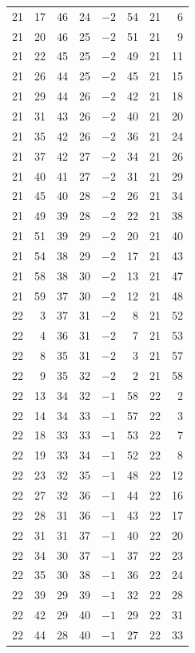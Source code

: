 \begin{center}
\begin{longtable}{rr c c rr rr}
21 & 17 & 46 & 24 & $-2$ & 54 & 21 & 6 \\
21 & 20 & 46 & 25 & $-2$ & 51 & 21 & 9 \\
21 & 22 & 45 & 25 & $-2$ & 49 & 21 & 11 \\
21 & 26 & 44 & 25 & $-2$ & 45 & 21 & 15 \\
21 & 29 & 44 & 26 & $-2$ & 42 & 21 & 18 \\
21 & 31 & 43 & 26 & $-2$ & 40 & 21 & 20 \\
21 & 35 & 42 & 26 & $-2$ & 36 & 21 & 24 \\
21 & 37 & 42 & 27 & $-2$ & 34 & 21 & 26 \\
21 & 40 & 41 & 27 & $-2$ & 31 & 21 & 29 \\
21 & 45 & 40 & 28 & $-2$ & 26 & 21 & 34 \\
21 & 49 & 39 & 28 & $-2$ & 22 & 21 & 38 \\
21 & 51 & 39 & 29 & $-2$ & 20 & 21 & 40 \\
21 & 54 & 38 & 29 & $-2$ & 17 & 21 & 43 \\
21 & 58 & 38 & 30 & $-2$ & 13 & 21 & 47 \\
21 & 59 & 37 & 30 & $-2$ & 12 & 21 & 48 \\
22 & 3 & 37 & 31 & $-2$ & 8 & 21 & 52 \\
22 & 4 & 36 & 31 & $-2$ & 7 & 21 & 53 \\
22 & 8 & 35 & 31 & $-2$ & 3 & 21 & 57 \\
22 & 9 & 35 & 32 & $-2$ & 2 & 21 & 58 \\
22 & 13 & 34 & 32 & $-1$ & 58 & 22 & 2 \\
22 & 14 & 34 & 33 & $-1$ & 57 & 22 & 3 \\
22 & 18 & 33 & 33 & $-1$ & 53 & 22 & 7 \\
22 & 19 & 33 & 34 & $-1$ & 52 & 22 & 8 \\
22 & 23 & 32 & 35 & $-1$ & 48 & 22 & 12 \\
22 & 27 & 32 & 36 & $-1$ & 44 & 22 & 16 \\
22 & 28 & 31 & 36 & $-1$ & 43 & 22 & 17 \\
22 & 31 & 31 & 37 & $-1$ & 40 & 22 & 20 \\
22 & 34 & 30 & 37 & $-1$ & 37 & 22 & 23 \\
22 & 35 & 30 & 38 & $-1$ & 36 & 22 & 24 \\
22 & 39 & 29 & 39 & $-1$ & 32 & 22 & 28 \\
22 & 42 & 29 & 40 & $-1$ & 29 & 22 & 31 \\
22 & 44 & 28 & 40 & $-1$ & 27 & 22 & 33 \\

\end{longtable}
\end{center}
